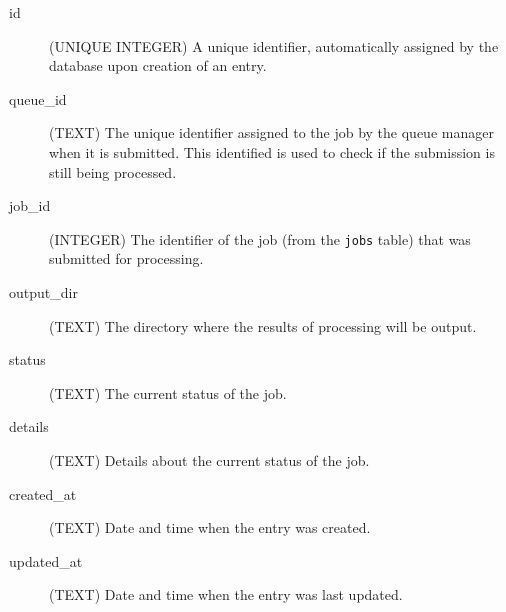 \documentclass[12pt]{article}
\begin{document}
\begin{description}
    \item[id] (UNIQUE INTEGER)  A unique identifier, automatically assigned by the database upon creation of an entry.
    \item[queue\_id] (TEXT) The unique identifier assigned to the job by the queue manager when it is submitted. This identified is used to check if the submission is still being processed.
    \item[job\_id] (INTEGER) The identifier of the job (from the \texttt{jobs} table) that was submitted for processing.
    \item[output\_dir] (TEXT) The directory where the results of processing will be output.
    \item[status] (TEXT) The current status of the job.
    \item[details] (TEXT) Details about the current status of the job.
    \item[created\_at] (TEXT) Date and time when the entry was created.
    \item[updated\_at] (TEXT) Date and time when the entry was last updated.
\end{description}
\end{document}
